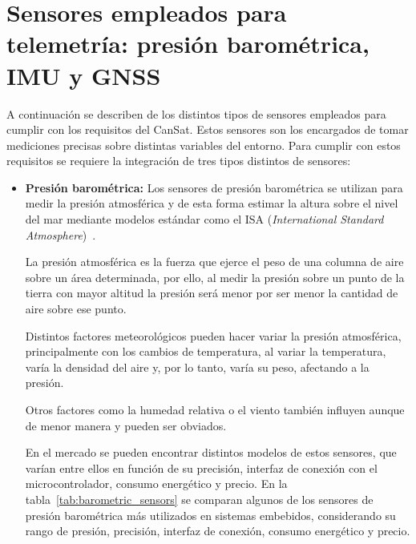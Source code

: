 \section{Sensores empleados para telemetría: presión barométrica, IMU y GNSS}
A continuación se describen de los distintos tipos de sensores empleados para cumplir con los requisitos del CanSat.
Estos sensores son los encargados de tomar mediciones precisas sobre distintas variables del entorno.
Para cumplir con estos requisitos se requiere la integración de tres tipos distintos de sensores:
\begin{itemize}
    \item \textbf{Presión barométrica:} Los sensores de presión barométrica se utilizan para medir la presión atmosférica y de esta forma estimar la altura sobre el nivel del mar mediante modelos estándar como el ISA (\emph{International Standard Atmosphere})~\cite{skybrary_isa}.

    La presión atmosférica es la fuerza que ejerce el peso de una columna de aire sobre un área determinada,
    por ello, al medir la presión sobre un punto de la tierra con mayor altitud la presión será menor por ser menor la cantidad de aire sobre ese punto.

    Distintos factores meteorológicos pueden hacer variar la presión atmosférica, principalmente con los cambios de temperatura,
    al variar la temperatura, varía la densidad del aire y, por lo tanto, varía su peso, afectando a la presión.

    Otros factores como la humedad relativa o el viento también influyen aunque de menor manera y pueden ser obviados.

    En el mercado se pueden encontrar distintos modelos de estos sensores, que varían entre ellos en función de su precisión, interfaz de conexión con el microcontrolador, consumo energético y precio.
    En la tabla~\ref{tab:barometric_sensors} se comparan algunos de los sensores de presión barométrica más utilizados en sistemas embebidos, considerando su rango de presión, precisión, interfaz de conexión, consumo energético y precio.


\end{itemize}
